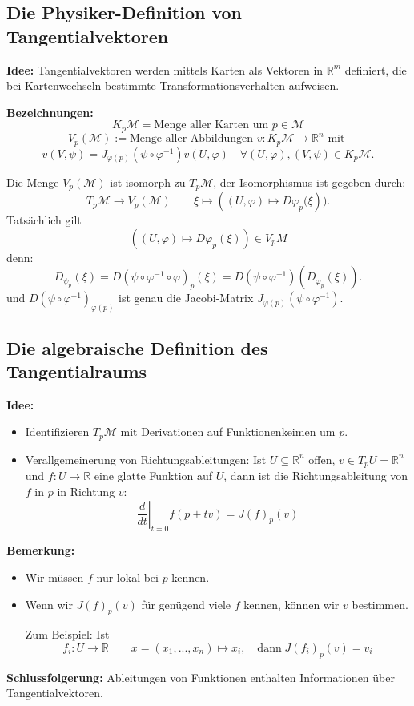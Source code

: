 \documentclass[fleqn, 12pt, letterpaper]{article}
\newcommand{\txt}[1]{\text{#1}}
\begin{document}
\subsection{Die Physiker-Definition von Tangentialvektoren}

\textbf{Idee:} 
Tangentialvektoren werden mittels Karten als Vektoren in \(\mathbb{R}^m\) definiert, die bei Kartenwechseln bestimmte Transformationsverhalten aufweisen.

\vspace{0.5cm}

\textbf{Bezeichnungen:}
\[
K_p\mathcal{M} = \text{Menge aller Karten um } p \in \mathcal{M}
\]
\[
V_p(\mathcal{M}) := \text{Menge aller Abbildungen } v: K_p\mathcal{M} \to \mathbb{R}^n \text{ mit }
\]
\[
v(V, \psi) = J_{\varphi(p)}(\psi \circ \varphi^{-1}) v(U, \varphi) \quad \forall (U, \varphi), (V, \psi) \in K_p\mathcal{M}.
\]

Die Menge \(V_p(\mathcal{M})\) ist isomorph zu \(T_p\mathcal{M}\), der Isomorphismus ist gegeben durch:
\[
T_p\mathcal{M} \longrightarrow V_p(\mathcal{M}) \qquad \xi \mapsto \left( (U, \varphi) \mapsto D\varphi_p(\xi \right)).
\]
Tatsächlich gilt \[((U,\varphi)\mapsto D\varphi_p(\xi))\in V_pM \]denn:
\[
D_{\psi_p}(\xi) = D(\psi \circ \varphi^{-1} \circ \varphi)_p(\xi)
= D(\psi \circ \varphi^{-1})\left( D_{\varphi_p}(\xi) \right).
\]
und
\(D(\psi \circ \varphi^{-1})_{\varphi(p)}\)
ist genau die Jacobi-Matrix \(J_{\varphi(p)}(\psi\circ \varphi^{-1})\).

\subsection{Die algebraische Definition des Tangentialraums}
\textbf{Idee:}
\begin{itemize}
    \item Identifizieren \( T_p\mathcal{M} \) mit Derivationen auf Funktionenkeimen um \( p \).
    \item Verallgemeinerung von Richtungsableitungen: Ist \( U \subseteq \mathbb{R}^n \) offen, $v\in T_pU=\mathbb{R}^n$ und \( f: U \longrightarrow \mathbb{R} \) eine glatte Funktion auf \( U \), dann ist die Richtungsableitung von \( f \) in \( p \) in Richtung \( v \):
    \[
     \left.\frac{d}{dt}\right|_{t=0} f(p+tv)=J(f)_p(v)
    \]
\end{itemize}

\textbf{Bemerkung:}
\begin{itemize}
    \item Wir müssen \( f \) nur lokal bei \( p \) kennen.
    \item Wenn wir \( J(f)_p(v) \) für genügend viele \( f \) kennen, können wir \( v \) bestimmen.
    
    Zum Beispiel: Ist
    \[
    f_i: U \to \mathbb{R} \qquad x=(x_1,...,x_n)\mapsto x_i ,
   \quad \txt{dann}\; J(f_i)_p(v)=v_i
    \]
  
\end{itemize}
\textbf{Schlussfolgerung:} Ableitungen von Funktionen enthalten Informationen über Tangentialvektoren.\\
\end{document}
